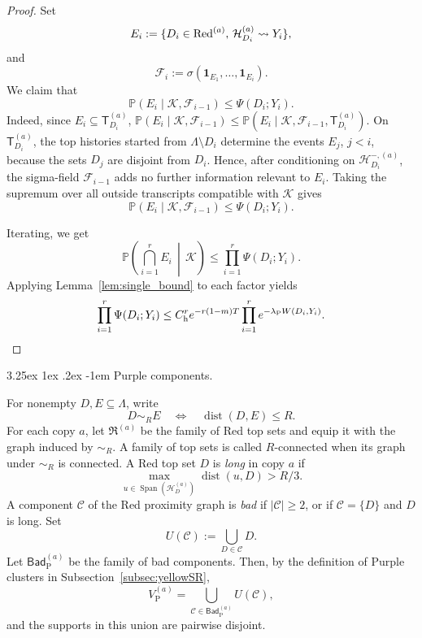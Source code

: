 \documentclass[letterpaper,11pt,reqno]{amsart}
\makeatletter
\theoremstyle{definition}
\renewcommand\paragraph{\@startsection{paragraph}{4}{\z@}%
  {3.25ex \@plus1ex \@minus.2ex}%
  {-1em}%
  {\normalfont\normalsize\bfseries}}
\makeatother
\begin{document}
\begin{proof}
Set
\[
        E_i:=
        \{D_i\in{\rm Red}^{(a)},\,
          \mathcal H_{D_i}^{(a)}\rightsquigarrow Y_i\},
\]
and 
\[
        \mathscr F_i
        :=
        \sigma(\mathbf 1_{E_1},\ldots,\mathbf 1_{E_i}).
\]
We claim that
\[
\mathbb{P}(E_i\mid\mathcal K,\mathscr F_{i-1})\leq \Psi (D_i;Y_i).
\]
Indeed, since \(E_i\subseteq \mathsf T_{D_i}^{(a)}\), $\mathbb P(E_i\mid \mathcal K,\mathscr F_{i-1})
\le
\mathbb P(E_i\mid \mathcal K,\mathscr F_{i-1},\mathsf T_{D_i}^{(a)}).$
On \(\mathsf T_{D_i}^{(a)}\), the top histories started from
\(\Lambda\setminus D_i\) determine the events \(E_j\), \(j<i\), because the
sets \(D_j\) are disjoint from \(D_i\). Hence, after conditioning on
\(\mathcal H_{D_i}^{-,(a)}\), the sigma-field \(\mathscr F_{i-1}\) adds no
further information relevant to \(E_i\). Taking the supremum over all outside
transcripts compatible with \(\mathcal K\) gives
\[
\mathbb P(E_i\mid\mathcal K,\mathscr F_{i-1})
\le \Psi(D_i;Y_i).
\]

Iterating, we get
\[
\mathbb P\left(\bigcap_{i=1}^r E_i\,\middle|\,\mathcal K\right)
\le
\prod_{i=1}^r \Psi(D_i;Y_i).
\]
Applying Lemma~\ref{lem:single_bound} to each factor yields
\[
\prod_{i=1}^r \Psi(D_i;Y_i)
\le
C_{\rm h}^r e^{-r(1-m)T}
\prod_{i=1}^r e^{-\lambda_{\rm P} W(D_i,Y_i)}.
\]
\end{proof}


\paragraph{Purple components.}

For nonempty \(D,E\subseteq\Lambda\), write
\[
        D\sim_R E
        \quad\Longleftrightarrow\quad
        \operatorname{dist}(D,E)\le R.
\]
For each copy \(a\), let \(\mathfrak R^{(a)}\) be the family of Red top
sets and equip it with the graph induced by \(\sim_R\).
A family of top sets is called \(R\)-connected when its graph under
\(\sim_R\) is connected. A Red top set \(D\) is \emph{long} in copy \(a\)
if
\[
        \max_{u\in\operatorname{Span}(\mathcal H_D^{(a)})}
        \operatorname{dist}(u,D)>R/3.
\]
A component \(\mathcal C\) of the Red proximity graph is \emph{bad} if
\(|\mathcal C|\ge2\), or if \(\mathcal C=\{D\}\) and \(D\) is long. Set
\[
        U(\mathcal C):=\bigcup_{D\in\mathcal C}D.
\]
Let
\(\mathsf{Bad}_{\mathrm P}^{(a)}\) be the family of bad components. Then, by the definition of Purple clusters in
Subsection~\ref{subsec:yellowSR},
\[
        V_{\mathrm P}^{(a)}
        =
        \bigcup_{\mathcal C\in\mathsf{Bad}_{\mathrm P}^{(a)}}U(\mathcal C),
\]
and the supports in this union are pairwise disjoint.
\end{document}
